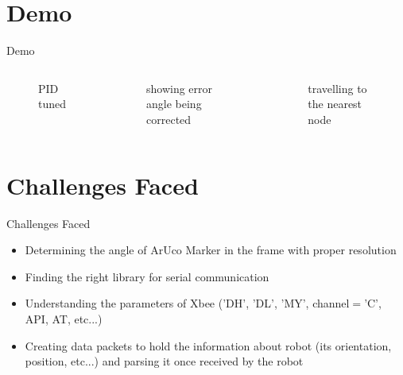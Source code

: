 \documentclass[10pt,a4paper]{beamer}
\begin{document}
\section{Demo}
\begin{frame}{Demo}
\begin{columns}
\begin{figure}

\vspace{-1 em}\caption{\small{PID tuned}}
\end{figure}\vspace{-2 em}
\begin{figure}
\vspace{-1 em}\caption{\small{showing error angle being corrected}}
\end{figure}
\begin{figure}

\caption{travelling to the nearest node}
\end{figure}

\end{columns}

\end{frame}


\section{Challenges Faced}
\begin{frame}{Challenges Faced}
	\begin{itemize}
		\item Determining the angle of ArUco Marker in the frame with proper resolution\pause
		\item Finding the right library for serial communication\pause
		\item Understanding the parameters of Xbee ('DH', 'DL', 'MY', channel$=$'C', API, AT, etc...)\pause
		\item Creating data packets to hold the information about robot (its orientation, position, etc...) and parsing it once received by the robot
	\end{itemize}
\end{frame}
\end{document}
